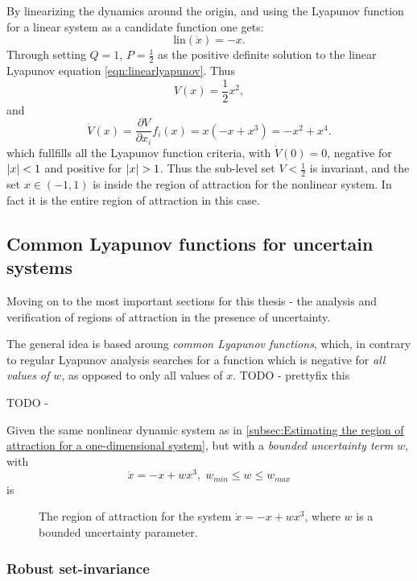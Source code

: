 By linearizing the dynamics around the origin, and using the Lyapunov function
for a linear system as a candidate function one gets:
\[
  \text{lin}(\dot{x}) = -x.
\]
Through setting \(Q=1\), \(P=\frac{1}{2}\) as the positive definite solution to
the linear Lyapunov equation \ref{eqn:linearlyapunov}. Thus
\[
  V(x) = \frac{1}{2}x^2,
\]
and
\[
  \dot{V}(x) = \frac{\partial V}{\partial x_i} f_i(x) = x(-x + x^3) = -x^2 + x^4.
\]
which fullfills all the Lyapunov function criteria, with \(\dot{V}(0) = 0\),
negative for \(\lvert x\rvert<1\) and positive for \(\lvert x\rvert > 1\). Thus the sub-level
set \(V < \frac{1}{2}\) is invariant, and the set \(x \in \left( -1, 1 \right)\)
is inside the region of attraction for the nonlinear system. In fact it is the
entire region of attraction in this case.

\subsection{Common Lyapunov functions for uncertain systems}

Moving on to the most important sections for this thesis - the analysis and
verification of regions of attraction in the presence of uncertainty.

The general idea is based aroung \textit{common Lyapunov functions}, which, in
contrary to regular Lyapunov analysis searches for a function which is negative
for \textit{all values of \(w\)}, as opposed to only all values of \(x\).
TODO - prettyfix this

\begin{definition}
TODO -
\end{definition}

\begin{example}
  Given the same nonlinear dynamic system as in \ref{subsec:Estimating the
    region of attraction for a one-dimensional system}, but with a
  \textit{bounded uncertainty term} \(w\), with 
  \[
    \dot{x} = -x + wx^3, \; w_{min} \leq w \leq w_{max}
  \]
  is 

  \begin{figure}
    
    \caption{The region of attraction for the system \(\dot{x} = -x + wx^3\),
      where \(w\) is a bounded uncertainty parameter.}
  \end{figure}
\end{example}

\subsubsection{Robust set-invariance}

